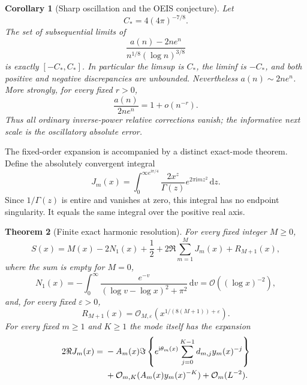 \documentclass[11pt]{article}
\newtheorem{theorem}{Theorem}[section]
\newtheorem{corollary}[theorem]{Corollary}
\theoremstyle{remark}\newtheorem{remark}[theorem]{Remark}
\newcommand{\eps}{\varepsilon}
\newcommand{\OO}{\mathcal O}
\newcommand{\ii}{\mathrm i}
\newcommand{\dd}{\,\mathrm d}
\begin{document}
\begin{corollary}[Sharp oscillation and the OEIS conjecture]\label{srf:cor:sharp}
Let
\begin{equation}\label{srf:eq:Cstar}
 C_*=4(4\pi)^{-7/8}.
\end{equation}
The set of subsequential limits of
\[
 \frac{a(n)-2ne^n}{n^{1/8}(\log n)^{3/8}}
\]
is exactly $[-C_*,C_*]$. In particular the limsup is $C_*$, the liminf is $-C_*$, and both positive and negative discrepancies are unbounded. Nevertheless $a(n)\sim2ne^n$. More strongly, for every fixed $r>0$,
\begin{equation}\label{srf:eq:relative}
 \frac{a(n)}{2ne^n}=1+o(n^{-r}).
\end{equation}
Thus all ordinary inverse-power relative corrections vanish; the informative next scale is the oscillatory absolute error.
\end{corollary}

The fixed-order expansion is accompanied by a distinct exact-mode theorem. Define the absolutely convergent integral
\begin{equation}\label{srf:eq:J}
 J_m(x)=\int_0^{\infty e^{\ii\pi/4}}
        \frac{2x^z}{\Gamma(z)}e^{2\pi\ii m z^2}\dd z.
\end{equation}
Since $1/\Gamma(z)$ is entire and vanishes at zero, this integral has no endpoint singularity. It equals the same integral over the positive real axis.

\begin{theorem}[Finite exact harmonic resolution]\label{srf:thm:finite}
For every fixed integer $M\ge0$,
\begin{equation}\label{srf:eq:finite}
 S(x)=M(x)-2N_1(x)+\frac12
           +2\Re\sum_{m=1}^M J_m(x)+R_{M+1}(x),
\end{equation}
where the sum is empty for $M=0$,
\begin{equation}\label{srf:eq:N1}
 N_1(x)=-\int_0^\infty
       \frac{e^{-v}}{(\log v-\log x)^2+\pi^2}\dd v
       =\OO((\log x)^{-2}),
\end{equation}
and, for every fixed $\eps>0$,
\begin{equation}\label{srf:eq:tail}
 R_{M+1}(x)=\OO_{M,\eps}
             \left(x^{1/(8(M+1))+\eps}\right).
\end{equation}
For every fixed $m\ge1$ and $K\ge1$ the mode itself has the expansion
\begin{align}
 2\Re J_m(x)
  ={}&-A_m(x)\Im\left\{e^{\ii\theta_m(x)}
                 \sum_{j=0}^{K-1}d_{m,j}y_m(x)^{-j}\right\}\notag\\
     &+\OO_{m,K}(A_m(x)y_m(x)^{-K})+\OO_m(L^{-2}).\label{srf:eq:mode}
\end{align}
\end{theorem}
\end{document}
